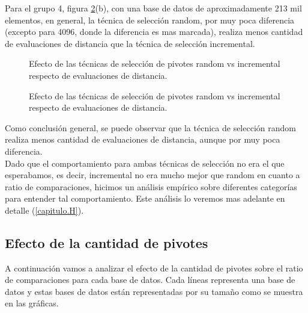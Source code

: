 Para el grupo 4, figura \ref{fig:ETS-2}(b), con una base de datos de aproximadamente 213 mil elementos, en general, la t\'ecnica de selecci\'on random, por muy poca diferencia (excepto para 4096, donde la diferencia es mas marcada), realiza menos cantidad de evaluaciones de distancia que la t\'ecnica de selecci\'on incremental.\\


\begin{figure}[tb]
\centering
{}
\caption{\small Efecto de las t\'ecnicas de selecci\'on de pivotes random vs incremental respecto de evaluaciones de distancia.}
\label{fig:ETS-1}
\end{figure}
\begin{figure}[tb]
\centering
{}
\caption{\small Efecto de las t\'ecnicas de selecci\'on de pivotes random vs incremental respecto de evaluaciones de distancia.}
\label{fig:ETS-2}

\end{figure}

Como conclusi\'on general, se puede observar que la t\'ecnica de selecci\'on random realiza menos cantidad de evaluaciones de distancia, aunque por muy poca diferencia.\\
 
Dado que el comportamiento para ambas t\'ecnicas de selecci\'on no era el que esperabamos, es decir, incremental no era mucho mejor que random en cuanto a ratio de comparaciones, hicimos un an\'alisis emp\'irico sobre diferentes categor\'ias para entender tal comportamiento. Este an\'alisis lo veremos mas adelante en detalle (\ref{capitulo.H}).

\subsection{Efecto de la cantidad de pivotes}

A continuaci\'on vamos a analizar el efecto de la cantidad de pivotes sobre el ratio de comparaciones para cada base de datos. Cada l\'ineas representa una base de datos y estas bases de datos est\'an representadas por su tamaño como se muestra en las gr\'aficas.\\

